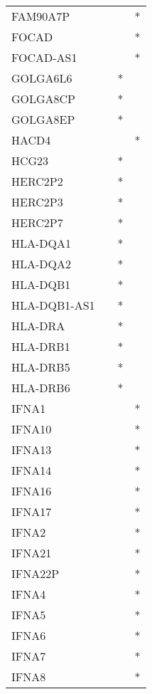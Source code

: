 \begin{longtable}{lccc}
FAM90A7P     &       &    &       * \\
FOCAD        &       &    &       * \\
FOCAD-AS1    &       &    &       * \\
GOLGA6L6     &       &  * &         \\
GOLGA8CP     &       &  * &         \\
GOLGA8EP     &       &  * &         \\
HACD4        &       &    &       * \\
HCG23        &       &  * &         \\
HERC2P2      &       &  * &         \\
HERC2P3      &       &  * &         \\
HERC2P7      &       &  * &         \\
HLA-DQA1     &       &  * &         \\
HLA-DQA2     &       &  * &         \\
HLA-DQB1     &       &  * &         \\
HLA-DQB1-AS1 &       &  * &         \\
HLA-DRA      &       &  * &         \\
HLA-DRB1     &       &  * &         \\
HLA-DRB5     &       &  * &         \\
HLA-DRB6     &       &  * &         \\
IFNA1        &       &    &       * \\
IFNA10       &       &    &       * \\
IFNA13       &       &    &       * \\
IFNA14       &       &    &       * \\
IFNA16       &       &    &       * \\
IFNA17       &       &    &       * \\
IFNA2        &       &    &       * \\
IFNA21       &       &    &       * \\
IFNA22P      &       &    &       * \\
IFNA4        &       &    &       * \\
IFNA5        &       &    &       * \\
IFNA6        &       &    &       * \\
IFNA7        &       &    &       * \\
IFNA8        &       &    &       * \\

\end{longtable}
